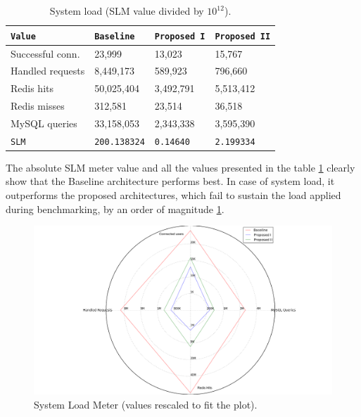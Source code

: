 \documentclass{uvamscse}
\begin{document}
\begin{table}[H]
\begin{center}
\begin{tabular}{llll}
  \texttt{Value}                & \texttt{Baseline}   & \texttt{Proposed I}  & \texttt{Proposed II} \\
  \hline
  Successful conn.              & 23,999              & 13,023               & 15,767              \\
  Handled requests              & 8,449,173           & 589,923              & 796,660              \\
  Redis hits                    & 50,025,404          & 3,492,791            & 5,513,412              \\
  Redis misses                  & 312,581             & 23,514               & 36,518              \\
  MySQL queries                 & 33,158,053          & 2,343,338            & 3,595,390              \\
  \hline
  \texttt{SLM}                  & \texttt{200.138324} & \texttt{0.14640}     & \texttt{2.199334}         \\
\end{tabular}
\end{center}
\caption{System load (SLM value divided by $10^{12}$).}
\label{table:slm}
\end{table}

The absolute SLM meter value and all the values presented in the table \ref{table:slm} clearly show that the Baseline architecture performs best. In case of system load, it outperforms the proposed architectures, which fail to sustain the load applied during benchmarking, by an order of magnitude \ref{figure:slm}.

\begin{figure}[H]
\centering
\includegraphics[scale=0.3]{slm}
\caption{System Load Meter (values rescaled to fit the plot).}
\label{figure:slm}
\end{figure}
\end{document}
